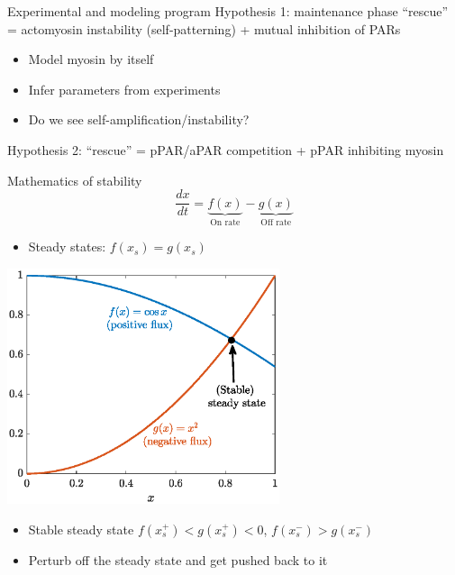 \documentclass{beamer}
\newcommand{\6}[1]{#1_{\text{6}}}
\newcommand{\3}[1]{#1_{\text{3}}}
\newcommand{\lightgray}[1]{\color{lightgray}#1\normalcolor}
\begin{document}
\begin{frame}{Experimental and modeling program}
Hypothesis 1: maintenance phase ``rescue'' = actomyosin instability (self-patterning) + mutual inhibition of PARs
\begin{itemize}
\item Model myosin by itself
\item Infer parameters from experiments
\item Do we see self-amplification/instability?
\end{itemize}
\lightgray{Hypothesis 2: ``rescue'' = pPAR/aPAR competition + pPAR inhibiting myosin}
\end{frame}

\begin{frame}{Mathematics of stability}
$$\frac{dx}{dt}=\underbrace{f(x)}_\text{On rate}-\underbrace{g(x)}_\text{Off rate}$$
\begin{itemize}
\item Steady states: $f(x_s)=g(x_s)$
\end{itemize}
\pause
\begin{center}
\includegraphics[width=0.6\textwidth]{FluxExample.eps}
\end{center}
\vspace{-0.3 cm}
\begin{itemize}
\item Stable steady state $f(x_s^+) < g(x_s^+) < 0$,  $f(x_s^-)  > g(x_s^-)$
\item Perturb off the steady state and get pushed back to it
\end{itemize}
\end{frame}
\end{document}
